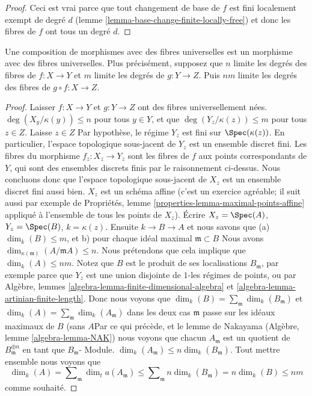 \begin{proof}
Ceci est vrai parce que tout changement de base de $f$ est fini localement exempt de degré $d$ (lemme \ref{lemma-base-change-finite-locally-free}) et donc les fibres de $f$ ont tous un degré $d$.
\end{proof}

\begin{lemma}

\label{lemma-composition-universally-bounded}
Une composition de morphismes avec des fibres universelles est un morphisme avec des fibres universelles. Plus précisément, supposez que $n$ limite les degrés des fibres de $f : X \to Y$ et $m$ limite les degrés de $g : Y \to Z$. Puis $nm$ limite les degrés des fibres de $g \circ f : X \to Z$.
\end{lemma}

\begin{proof}

Laisser $f : X \to Y$ et $g : Y \to Z$ ont des fibres universellement nées. $\deg(X_y/\kappa(y)) \leq n$ pour tous $y \in Y$, et que
$\deg(Y_z/\kappa(z)) \leq m$ pour tous $z \in Z$. Laisse $z \in Z$ Par hypothèse, le régime
$Y_z$ est fini sur $\Spec(\kappa(z))$. En particulier, l'espace topologique sous-jacent de $Y_z$
est un ensemble discret fini. Les fibres du morphisme
$f_z : X_z \to Y_z$ sont les fibres de $f$ aux points correspondants de $Y$, qui sont des ensembles discrets finis par le raisonnement ci-dessus. Nous concluons donc que l'espace topologique sous-jacent de $X_z$ est un ensemble discret fini aussi bien. $X_z$ est un schéma affine (c'est un exercice agréable; il suit aussi par exemple de Propriétés, lemme \ref{properties-lemma-maximal-points-affine}
appliqué à l'ensemble de tous les points de $X_z$). Écrire $X_z = \Spec(A)$,
$Y_z = \Spec(B)$, $k = \kappa(z)$. Ensuite $k \to B \to A$
et nous savons que (a) $\dim_k(B) \leq m$, et b) pour chaque idéal maximal $\mathfrak m \subset B$ Nous avons
$\dim_{\kappa(\mathfrak m)}(A/\mathfrak mA) \leq n$. Nous prétendons que cela implique que $\dim_k(A) \leq nm$. Notez que $B$ est le produit de ses localisations $B_{\mathfrak m}$, par exemple parce que $Y_z$ est une union disjointe de $1$-les régimes de points, ou par Algèbre, lemmes \ref{algebra-lemma-finite-dimensional-algebra} et
\ref{algebra-lemma-artinian-finite-length}. Donc nous voyons que
$\dim_k(B) = \sum_{\mathfrak m} \dim_k(B_{\mathfrak m})$ et
$\dim_k(A) = \sum_{\mathfrak m} \dim_k(A_{\mathfrak m})$ dans les deux cas $\mathfrak m$ passe sur les idéaux maximaux de
$B$ (sans $A$Par ce qui précède, et le lemme de Nakayama (Algèbre, lemme \ref{algebra-lemma-NAK}) nous voyons que chacun $A_{\mathfrak m}$ est un quotient de
$B_{\mathfrak m}^{\oplus n}$ en tant que $B_{\mathfrak m}$- Module.
$\dim_k(A_{\mathfrak m}) \leq n \dim_k(B_{\mathfrak m})$. Tout mettre ensemble nous voyons que
$$
\dim_k(A) = \sum\nolimits_{\mathfrak m} \dim_ta	(A_{\mathfrak m})
\leq \sum\nolimits_{\mathfrak m} n \dim_k(B_{\mathfrak m})
= n \dim_k(B) \leq nm
$$
comme souhaité.

\end{proof}

